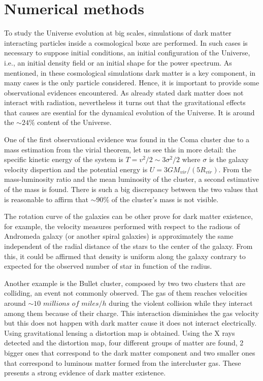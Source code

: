 \section{ Numerical methods }


To study the Universe evolution at big scales, simulations of dark matter
interacting particles inside a cosmological boxe are performed. 
In such cases is necessary to suppose initial conditions,
an initial configuration of the Universe, i.e., an initial density field
or an initial shape for the power spectrum. As mentioned, in these cosmological 
simulations dark matter is a key component, in many cases is the only particle considered.
Hence, it is important to provide some observational evidences encountered. 
As already stated dark matter does not interact with radiation, nevertheless it turns
out that the gravitational effects that causes are esential for the dynamical evolution
of the Universe. It is around the  $\sim 24\%$ content of the Universe.

One of the first observational evidence was found in the Coma cluster due to
a mass estimation from the virial theorem, let us see this in more detail: 
the specific kinetic energy of the system is $T = v^2/2 \sim 3\sigma^2/2 $ 
where $\sigma$ is the galaxy velocity dispertion and the potential energy
is $U = 3GM_{vir}/(5R_{vir})$. From the mass-luminosity ratio and the 
mean luminosity of the cluster, a second estimative of the mass is found. There is
such a big discrepancy between the two values that is reasonable to affirm that $\sim 90\%$ of the 
cluster's mass is not visible. 

The rotation curve of the galaxies can be other prove for dark matter existence,
for example, the velocity measures performed with respect to the radious of Andromeda 
galaxy (or another spiral galaxies) is approximately the same independent of the radial
distance of the stars to the center of the galaxy. From this, it could be affirmed that
density is uniform along the galaxy contrary to expected for the observed 
number of star in function of the radius. 


Another example is the Bullet cluster, composed by two two clusters that are colliding, 
an event not commonly observed. The gas of them reaches velocities around $\sim 10$ $millions$ $of$ $miles/h$ during the violent collision while they interact among them because of their charge. 
This interaction disminishes the gas velocity but this does not happen with dark
matter cause it does not interact electrically. 
Using gravitational lensing a distortion map is obtained. Using the X rays detected
and the distortion map, four different groups of matter are found, 2 bigger ones
that correspond to the dark matter component and two smaller ones that correspond
to luminous matter formed from the intercluster gas. These presents a strong
evidence of dark matter existence. 


